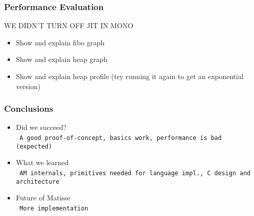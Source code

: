 \documentclass[handout]{beamer}
\newcommand{\n}[1]{\\~\texttt{\color{red}\tiny #1}}
\begin{document}
\begin{frame}
  \frametitle{Performance Evaluation}

  WE DIDN'T TURN OFF JIT IN MONO

  \begin{itemize}
  \item Show and explain fibo graph
  \item Show and explain heap graph
  \item Show and explain heap profile (try running it again to get an exponential version)
  \end{itemize}
\end{frame}

\begin{frame}
  \frametitle{Conclusions}

  \begin{itemize}
  \item Did we succeed?
    \n{A good proof-of-concept, basics work, performance is bad (expected)}
  \item What we learned
    \n{AM internals, primitives needed for language impl., C design and architecture}
  \item Future of Matisse
    \n{More implementation}
  \end{itemize}
\end{frame}
\end{document}
